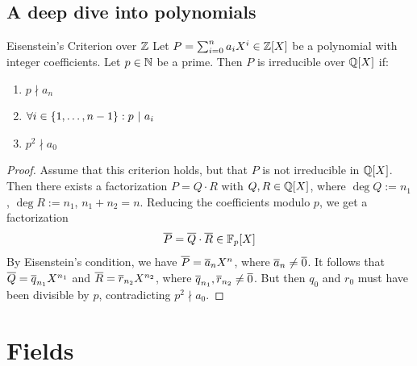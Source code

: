 \documentclass[10pt]{report}
\theoremstyle{definition}
\begin{document}
	\section{A deep dive into polynomials}
	\begin{importanttheorem}{Eisenstein's Criterion over $\mathbb{Z}$}{}
		Let $P = \sum_{i = 0}^n a_i X^i \in \mathbb{Z}[X]$ be a polynomial with integer coefficients. Let $p \in \mathbb{N}$ be a prime. Then $P$ is irreducible over $\mathbb{Q}[X]$ if:
		\begin{enumerate}
			\item $p \nmid a_n$
			\item $\forall i \in \qty{1, \hdots, n-1} : p ~|~ a_i$ 
			\item $p^2 \nmid a_0$
		\end{enumerate}
	\end{importanttheorem}
	\begin{proof}
		Assume that this criterion holds, but that $P$ is not irreducible in $\mathbb{Q}[X]$. Then there exists a factorization $P = Q \cdot R$ with $Q, R \in \mathbb{Q}[X]$, where $\deg Q := n_1$, $\deg R := n_1$, $n_1 + n_2 = n$. Reducing the coefficients modulo $p$, we get a factorization
		\begin{align*}
			\overline{{P}} = \overline{{Q}} \cdot \overline{{R}} \in \mathbb{F}_p[X]
		\end{align*}
		By Eisenstein's condition, we have $\overline{{P}} = \overline{{a}}_n X^n$, where $\overline{{a}}_n \neq \overline{{0}}$. It follows that $\overline{{Q}} = \overline{{q}}_{n_1} X^{n_1}$ and $\overline{{R}} = \overline{{r}}_{n_2} X^{n_2}$, where $\overline{{q}}_{n_1}, \overline{{r}}_{n_2} \neq \overline{{0}}$. But then $q_0$ and $r_0$ must have been divisible by $p$, contradicting $p^2 \nmid a_0$.
	\end{proof}
	\chapter{Fields}
\end{document}
